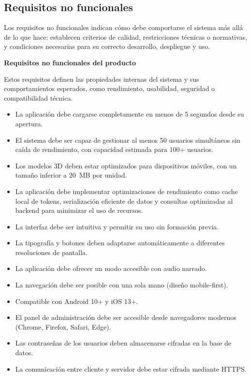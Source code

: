 \subsection{Requisitos no funcionales}
Los requisitos no funcionales indican cómo debe comportarse el sistema más allá de lo que hace: establecen criterios de calidad, restricciones técnicas o normativas, y condiciones necesarias para su correcto desarrollo, despliegue y uso.

\textbf{Requisitos no funcionales del producto}

Estos requisitos definen las propiedades internas del sistema y sus comportamientos esperados, como rendimiento, usabilidad, seguridad o compatibilidad técnica.

\begin{itemize}
    \item[RNF1:] La aplicación debe cargarse completamente en menos de 5 segundos desde su apertura.
    \item[RNF2:] El sistema debe ser capaz de gestionar al menos 50 usuarios simultáneos sin caída de rendimiento, con capacidad estimada para 100+ usuarios. 
    \item[RNF3:] Los modelos 3D deben estar optimizados para dispositivos móviles, con un tamaño inferior a 20~MB por unidad.
    \item[RNF4:] La aplicación debe implementar optimizaciones de rendimiento como cache local de tokens, serialización eficiente de datos y consultas optimizadas al backend para minimizar el uso de recursos.
    \item[RNF5:] La interfaz debe ser intuitiva y permitir su uso sin formación previa.
    \item[RNF6:] La tipografía y botones deben adaptarse automáticamente a diferentes resoluciones de pantalla.
    \item[RNF7:] La aplicación debe ofrecer un modo accesible con audio narrado.
    \item[RNF8:] La navegación debe ser posible con una sola mano (diseño mobile-first).
    \item[RNF9:] Compatible con Android 10+ y iOS 13+.
    \item[RNF10:] El panel de administración debe ser accesible desde navegadores modernos (Chrome, Firefox, Safari, Edge).
    \item[RNF11:] Las contraseñas de los usuarios deben almacenarse cifradas en la base de datos.
    \item[RNF12:] La comunicación entre cliente y servidor debe estar cifrada mediante HTTPS.

\end{itemize}
